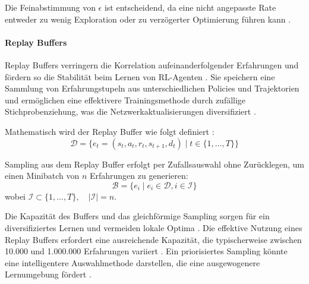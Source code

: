 Die Feinabstimmung von \(\epsilon\) ist entscheidend, da eine nicht angepasste Rate entweder zu wenig Exploration oder zu verzögerter Optimierung führen kann \cite{morales2020grokking}.



\paragraph{Replay Buffers}
\label{sec:Replay Buffers}

Replay Buffers verringern die Korrelation aufeinanderfolgender Erfahrungen und fördern so die Stabilität beim Lernen von RL-Agenten \cite{morales2020grokking}. Sie speichern eine Sammlung von Erfahrungstupeln aus unterschiedlichen Policies und Trajektorien und ermöglichen eine effektivere Trainingsmethode durch zufällige Stichprobenziehung, was die Netzwerkaktualisierungen diversifiziert \cite{morales2020grokking}.

Mathematisch wird der Replay Buffer wie folgt definiert \cite{morales2020grokking}:
\begin{equation}
		\mathcal{D} = \{ e_t = (s_t, a_t, r_t, s_{t+1}, d_t) \mid t \in \{1, \ldots, T\} \}
\end{equation}

Sampling aus dem Replay Buffer erfolgt per Zufallsauswahl ohne Zurücklegen, um einen Minibatch von \( n \) Erfahrungen zu generieren:
\begin{equation}
		\mathcal{B} = \{ e_i \mid e_i \in \mathcal{D}, i \in \mathcal{I} \}
		\label{eq:replay buffer}
\end{equation}
wobei \( \mathcal{I} \subset \{1, \ldots, T\}, \quad |\mathcal{I}| = n \).

Die Kapazität des Buffers und das gleichförmige Sampling sorgen für ein diversifiziertes Lernen und vermeiden lokale Optima \cite{morales2020grokking}. Die effektive Nutzung eines Replay Buffers erfordert eine ausreichende Kapazität, die typischerweise zwischen 10.000 und 1.000.000 Erfahrungen variiert \cite{morales2020grokking}. Ein priorisiertes Sampling könnte eine intelligentere Auswahlmethode darstellen, die eine ausgewogenere Lernumgebung fördert \cite{morales2020grokking}.
%
